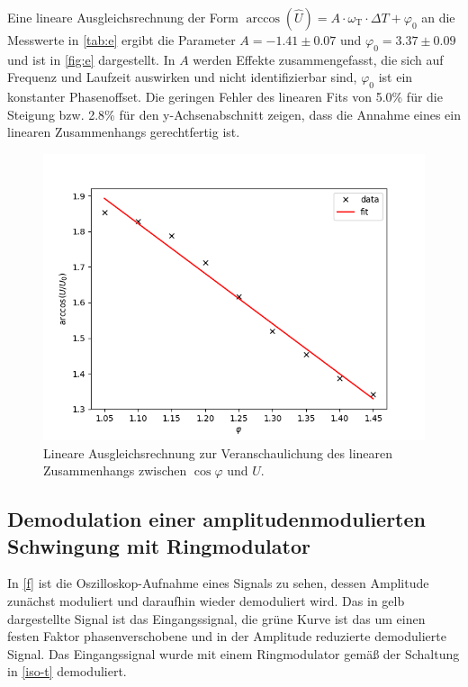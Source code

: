 Eine lineare Ausgleichsrechnung der Form $\arccos (\hat{U}) = A \cdot \omega_\text{T} \cdot \Delta T + \varphi_0$ an die Messwerte in \autoref{tab:e} ergibt die Parameter $A = -1.41 \pm 0.07$ und $\varphi_0 = 3.37 \pm 0.09$ und ist in \autoref{fig:e} dargestellt. In $A$ werden Effekte zusammengefasst, die sich auf Frequenz und Laufzeit auswirken und nicht identifizierbar sind, $\varphi_0$ ist ein konstanter Phasenoffset. Die geringen Fehler des linearen Fits von 5.0\% für die Steigung bzw. 2.8\% für den y-Achsenabschnitt zeigen, dass die Annahme eines ein linearen Zusammenhangs gerechtfertig ist.

\begin{figure}
	\centering
	\includegraphics[width=\textwidth]{img/linear_fit.png}
	\caption{Lineare Ausgleichsrechnung zur Veranschaulichung des linearen Zusammenhangs zwischen $\cos\varphi$ und $U$.}
	\label{fig:e}
\end{figure}

\subsection{Demodulation einer amplitudenmodulierten Schwingung mit Ringmodulator}

In \autoref{f} ist die Oszilloskop-Aufnahme eines Signals zu sehen, dessen Amplitude zunächst moduliert und daraufhin wieder demoduliert wird. Das in gelb dargestellte Signal ist das Eingangssignal, die grüne Kurve ist das um einen festen Faktor phasenverschobene und in der Amplitude reduzierte demodulierte Signal. Das Eingangssignal wurde mit einem Ringmodulator gemäß der Schaltung in \autoref{iso-t} demoduliert.

